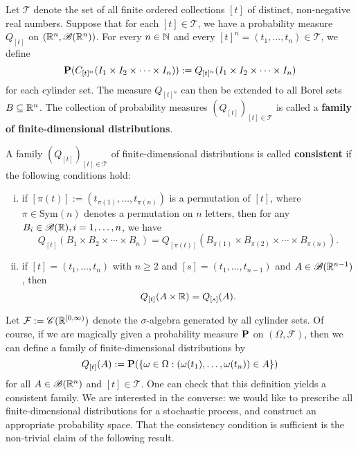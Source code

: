 Let $\mathcal{T}$ denote the set of all finite ordered collections $[t]$ of distinct, non-negative real numbers. Suppose that for each $[t]\in\mathcal{T}$, we have a probability measure $Q_{[t]}$ on $(\mathbb{R}^n,\mathscr{B}(\mathbb{R}^n))$. For every $n\in\mathbb{N}$ and every $[t]^n=(t_1,\ldots,t_n)\in\mathcal{T}$, we define
\begin{equation*}
    \mathbf{P}(C_{[t]^n}(I_1\times I_2\times\cdots\times I_n)) := Q_{[t]^n}(I_1\times I_2\times\cdots\times I_n)
\end{equation*}
for each cylinder set. The measure $Q_{[t]^n}$ can then be extended to all Borel sets $B\subseteq\mathbb{R}^n$. The collection of probability measures $(Q_{[t]})_{[t]\in\mathcal{T}}$ is called a \textbf{family of finite-dimensional distributions}.
\begin{definition}
    A family $(Q_{[t]})_{[t]\in\mathcal{T}}$ of finite-dimensional distributions is called \textbf{consistent} if the following conditions hold:
    \begin{enumerate}[(i)]
        \item if $[\pi(t)]:=(t_{\pi(1)},\ldots,t_{\pi(n)})$ is a permutation of $[t]$, where $\pi\in\mathrm{Sym}(n)$ denotes a permutation on $n$ letters, then for any $B_i\in\mathscr{B}(\mathbb{R}), i=1,\ldots,n$, we have
        \begin{equation*}
            Q_{[t]}(B_1\times B_2\times\cdots\times B_n) = Q_{[\pi(t)]}(B_{\pi(1)}\times B_{\pi(2)}\times\cdots\times B_{\pi(n)}).
        \end{equation*}

        \item if $[t]=(t_1,\ldots, t_n)$ with $n\ge 2$ and $[s]=(t_1,\ldots,t_{n-1})$ and $A\in\mathscr{B}(\mathbb{R}^{n-1})$, then
        \begin{equation*}
            Q_{[t]}(A\times\mathbb{R}) = Q_{[s]}(A).
        \end{equation*}
    \end{enumerate}
\end{definition}

Let $\mathcal{F}:=\mathscr{C}(\mathbb{R}^{[0,\infty)})$ denote the $\sigma$-algebra generated by all cylinder sets. Of course, if we are magically given a probability measure $\mathbf{P}$ on $(\Omega,\mathcal{F})$, then we can define a family of finite-dimensional distributions by
\begin{equation*}
    Q_{[t]}(A) := \mathbf{P}(\{\omega\in\Omega : (\omega(t_1),\ldots,\omega(t_n))\in A\})
\end{equation*}
for all $A\in\mathscr{B}(\mathbb{R}^n)$ and $[t]\in\mathcal{T}$. One can check that this definition yields a consistent family. We are interested in the converse: we would like to prescribe all finite-dimensional distributions for a stochastic process, and construct an appropriate probability space. That the consistency condition is sufficient is the non-trivial claim of the following result.

